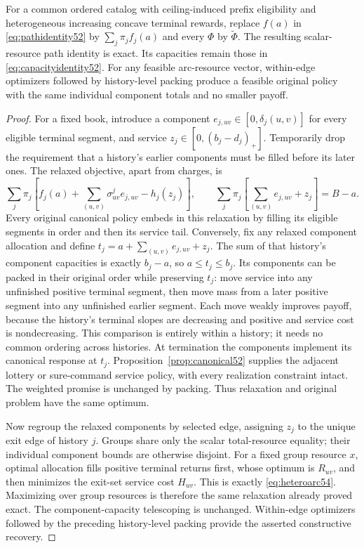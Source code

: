 \begin{theorem}\label{thm:packing54}
For a common ordered catalog with ceiling-induced prefix eligibility and heterogeneous increasing concave terminal rewards, replace $f(a)$ in \eqref{eq:pathidentity52} by $\sum_j\pi_jf_j(a)$ and every $\Phi$ by $\widetilde\Phi$. The resulting scalar-resource path identity is exact. Its capacities remain those in \eqref{eq:capacityidentity52}. For any feasible arc-resource vector, within-edge optimizers followed by history-level packing produce a feasible original policy with the same individual component totals and no smaller payoff.
\end{theorem}
\begin{proof}
For a fixed book, introduce a component $e_{j,uv}\in[0,\delta_j(u,v)]$ for every eligible terminal segment, and service $z_j\in[0,(b_j-d_j)_+]$. Temporarily drop the requirement that a history's earlier components must be filled before its later ones. The relaxed objective, apart from charges, is
\[
 \sum_j\pi_j\left[f_j(a)+\sum_{(u,v)}\sigma^j_{uv}e_{j,uv}-h_j(z_j)\right],
 \qquad \sum_j\pi_j\left[\sum_{(u,v)}e_{j,uv}+z_j\right]=B-a.
\]
Every original canonical policy embeds in this relaxation by filling its eligible segments in order and then its service tail. Conversely, fix any relaxed component allocation and define
$t_j=a+\sum_{(u,v)}e_{j,uv}+z_j$.
The sum of that history's component capacities is exactly $b_j-a$, so $a\leq t_j\leq b_j$. Its components can be packed in their original order while preserving $t_j$: move service into any unfinished positive terminal segment, then move mass from a later positive segment into any unfinished earlier segment. Each move weakly improves payoff, because the history's terminal slopes are decreasing and positive and service cost is nondecreasing. This comparison is entirely within a history; it needs no common ordering across histories. At termination the components implement its canonical response at $t_j$. Proposition~\ref{prop:canonical52} supplies the adjacent lottery or sure-command service policy, with every realization constraint intact. The weighted promise is unchanged by packing. Thus relaxation and original problem have the same optimum.

Now regroup the relaxed components by selected edge, assigning $z_j$ to the unique exit edge of history $j$. Groups share only the scalar total-resource equality; their individual component bounds are otherwise disjoint. For a fixed group resource $x$, optimal allocation fills positive terminal returns first, whose optimum is $R_{uv}$, and then minimizes the exit-set service cost $H_{uv}$. This is exactly \eqref{eq:heteroarc54}. Maximizing over group resources is therefore the same relaxation already proved exact. The component-capacity telescoping is unchanged. Within-edge optimizers followed by the preceding history-level packing provide the asserted constructive recovery.
\end{proof}

